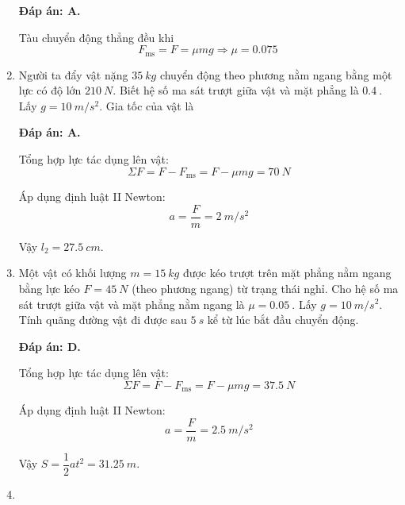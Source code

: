 \begin{enumerate}[label=\bfseries Câu \arabic*:]
	\hideall
	{	\textbf{Đáp án: A.}
		
		Tàu chuyển động thẳng đều khi
		$$F_\text{ms} = F = \mu mg \Rightarrow \mu = \SI{0.075}{}$$
	}
	
	\item {}
	
	
	{Người ta đẩy vật nặng $\SI{35}{kg}$ chuyển động theo phương nằm ngang bằng một lực có độ lớn $\SI{210}{N}$. Biết hệ số ma sát trượt giữa vật và mặt phẳng là $\SI{0.4}{}$. Lấy $g=\SI{10}{m/s^2}$. Gia tốc của vật là
	}
	
	\hideall
	{	\textbf{Đáp án: A.}	
		
		Tổng hợp lực tác dụng lên vật:
		$$\Sigma F= F-F_\text{ms} = F - \mu mg = \SI{70}{N}$$
		
		Áp dụng định luật II Newton:
		$$a=\dfrac{F}{m} = \SI{2}{m/s^2}$$
		
		Vậy $l_2 = \SI{27.5}{cm}$.
	}
	\item {}
	
	
	{Một vật có khối lượng $m=\SI{15}{kg}$ được kéo trượt trên mặt phẳng nằm ngang bằng lực kéo $F=\SI{45}{N}$ (theo phương ngang) từ trạng thái nghỉ. Cho hệ số ma sát trượt giữa vật và mặt phẳng nằm ngang là $\mu = \SI{0.05}{}$. Lấy $g=\SI{10}{m/s^2}$. Tính quãng đường vật đi được sau $\SI{5}{s}$ kể từ lúc bắt đầu chuyển động.
	}
	
	\hideall
	{	\textbf{Đáp án: D.}	
		
		Tổng hợp lực tác dụng lên vật:
		$$\Sigma F= F-F_\text{ms} = F - \mu mg = \SI{37.5}{N}$$
		
		Áp dụng định luật II Newton:
		$$a=\dfrac{F}{m} = \SI{2.5}{m/s^2}$$
		
		Vậy $S=\dfrac{1}{2}at^2 = \SI{31.25}{m}$.
	}
	\item {}
	

\end{enumerate}
